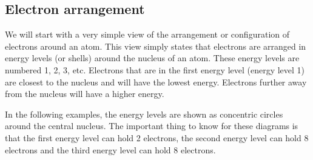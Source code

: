             \subsection*{Electron arrangement}
            \nopagebreak
            \label{m38741*id9722401}We will start with a very simple view of the arrangement or configuration of electrons around an atom. This view simply states that electrons are arranged in energy levels (or shells) around the nucleus of an atom. These energy levels are numbered 1, 2, 3, etc. Electrons that are in the first energy level (energy level 1) are closest to the nucleus and will have the lowest energy. Electrons further away from the nucleus will have a higher energy. \par 
\label{m38741*id259357}In the following examples, the energy levels are shown as concentric circles around the central nucleus. The important thing to know for these diagrams is that the first energy level can hold 2 electrons, the second energy level can hold 8 electrons and the third energy level can hold 8 electrons.\par 
